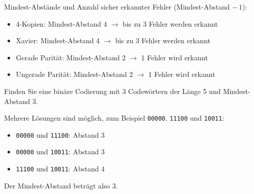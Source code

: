 \begin{myexercise}
    \begin{myanswer}
        Mindest-Abstände und Anzahl sicher erkannter Fehler (Mindest-Abstand $-\,1$):
        \begin{itemize}
            \item 4-Kopien: Mindest-Abstand 4 $\rightarrow$ bis zu 3 Fehler werden erkannt
            \item Xavier: Mindest-Abstand 4 $\rightarrow$ bis zu 3 Fehler werden erkannt
            \item Gerade Parität: Mindest-Abstand 2 $\rightarrow$ 1 Fehler wird erkannt
            \item Ungerade Parität: Mindest-Abstand 2 $\rightarrow$ 1 Fehler wird erkannt
        \end{itemize}
    \end{myanswer}
\end{myexercise}

\begin{mychallenge}\label{challenge:3code}
    Finden Sie eine binäre Codierung mit 3 Codewörtern der Länge 5 und Mindest-Abstand 3.
    \begin{myanswer}
        Mehrere Lösungen sind möglich, zum Beispiel \texttt{00000}, \texttt{11100} und \texttt{10011}:
        \begin{itemize}
            \item \texttt{00000} und \texttt{11100}: Abstand 3
            \item \texttt{00000} und \texttt{10011}: Abstand 3
            \item \texttt{11100} und \texttt{10011}: Abstand 4
        \end{itemize}
        Der Mindest-Abstand beträgt also 3.
    \end{myanswer}
\end{mychallenge}

